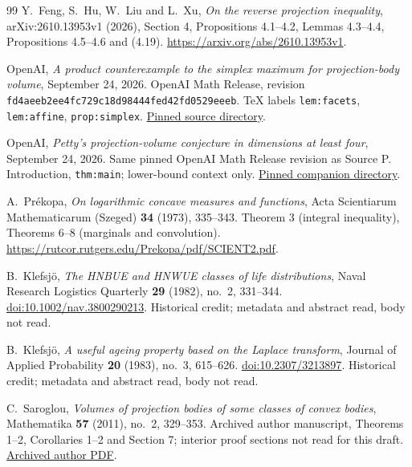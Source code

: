 \begingroup\raggedright
\begin{thebibliography}{99}
Y.~Feng, S.~Hu, W.~Liu and L.~Xu,
\emph{On the reverse projection inequality},
arXiv:2610.13953v1 (2026), Section 4, Propositions 4.1--4.2,
Lemmas 4.3--4.4, Propositions 4.5--4.6 and (4.19).
\url{https://arxiv.org/abs/2610.13953v1}.

OpenAI, \emph{A product counterexample to the simplex maximum for
projection-body volume}, September 24, 2026.
OpenAI Math Release, revision
\texttt{fd4aeeb2ee4fc729c18d98444fed42fd0529eeeb}.
TeX labels \texttt{lem:facets}, \texttt{lem:affine}, \texttt{prop:simplex}.
\href{https://github.com/openai/math/tree/fd4aeeb2ee4fc729c18d98444fed42fd0529eeeb/preprints/A-product-counterexample-to-the-simplex-maximum-for-projection-body-volume-September-24-2026}{Pinned source directory}.

OpenAI, \emph{Petty's projection-volume conjecture in dimensions at least four},
September 24, 2026. Same pinned OpenAI Math Release revision as Source P.
Introduction, \texttt{thm:main}; lower-bound context only.
\href{https://github.com/openai/math/tree/fd4aeeb2ee4fc729c18d98444fed42fd0529eeeb/preprints/Pettys-projection-volume-conjecture-in-dimensions-at-least-four-September-24-2026}{Pinned companion directory}.

A.~Pr\'ekopa, \emph{On logarithmic concave measures and functions},
Acta Scientiarum Mathematicarum (Szeged) \textbf{34} (1973), 335--343.
Theorem 3 (integral inequality), Theorems 6--8 (marginals and convolution).
\url{https://rutcor.rutgers.edu/Prekopa/pdf/SCIENT2.pdf}.

B.~Klefsj\"o, \emph{The HNBUE and HNWUE classes of life distributions},
Naval Research Logistics Quarterly \textbf{29} (1982), no.~2, 331--344.
\href{https://doi.org/10.1002/nav.3800290213}{doi:10.1002/nav.3800290213}.
Historical credit; metadata and abstract read, body not read.

B.~Klefsj\"o, \emph{A useful ageing property based on the Laplace transform},
Journal of Applied Probability \textbf{20} (1983), no.~3, 615--626.
\href{https://doi.org/10.2307/3213897}{doi:10.2307/3213897}.
Historical credit; metadata and abstract read, body not read.

C.~Saroglou, \emph{Volumes of projection bodies of some classes of convex bodies},
Mathematika \textbf{57} (2011), no.~2, 329--353.
Archived author manuscript, Theorems 1--2, Corollaries 1--2 and
Section 7; interior proof sections not read for this draft.
\href{https://web.archive.org/web/20260209013325id_/https://myweb.uoi.gr/csaroglou/projection%20bodies.pdf}{Archived author PDF}.


\end{thebibliography}
